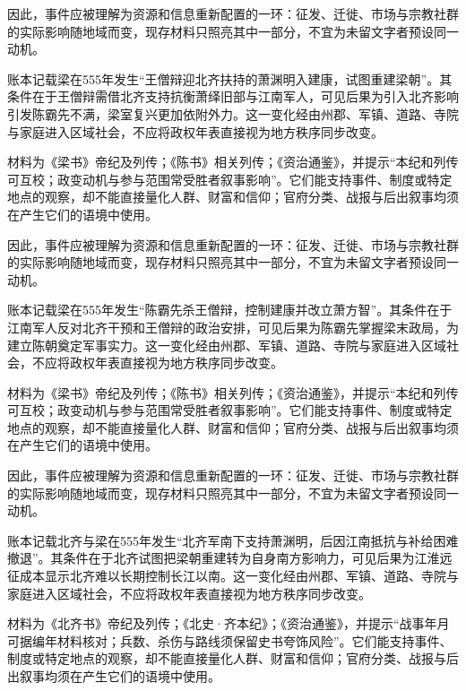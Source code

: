 因此，事件应被理解为资源和信息重新配置的一环：征发、迁徙、市场与宗教社群的实际影响随地域而变，现存材料只照亮其中一部分，不宜为未留文字者预设同一动机。

账本记载梁在555年发生“王僧辩迎北齐扶持的萧渊明入建康，试图重建梁朝”。其条件在于王僧辩需借北齐支持抗衡萧绎旧部与江南军人，可见后果为引入北齐影响引发陈霸先不满，梁室复兴更加依附外力。这一变化经由州郡、军镇、道路、寺院与家庭进入区域社会，不应将政权年表直接视为地方秩序同步改变。

材料为《梁书》帝纪及列传；《陈书》相关列传；《资治通鉴》，并提示“本纪和列传可互校；政变动机与参与范围常受胜者叙事影响”。它们能支持事件、制度或特定地点的观察，却不能直接量化人群、财富和信仰；官府分类、战报与后出叙事均须在产生它们的语境中使用。

因此，事件应被理解为资源和信息重新配置的一环：征发、迁徙、市场与宗教社群的实际影响随地域而变，现存材料只照亮其中一部分，不宜为未留文字者预设同一动机。

账本记载梁在555年发生“陈霸先杀王僧辩，控制建康并改立萧方智”。其条件在于江南军人反对北齐干预和王僧辩的政治安排，可见后果为陈霸先掌握梁末政局，为建立陈朝奠定军事实力。这一变化经由州郡、军镇、道路、寺院与家庭进入区域社会，不应将政权年表直接视为地方秩序同步改变。

材料为《梁书》帝纪及列传；《陈书》相关列传；《资治通鉴》，并提示“本纪和列传可互校；政变动机与参与范围常受胜者叙事影响”。它们能支持事件、制度或特定地点的观察，却不能直接量化人群、财富和信仰；官府分类、战报与后出叙事均须在产生它们的语境中使用。

因此，事件应被理解为资源和信息重新配置的一环：征发、迁徙、市场与宗教社群的实际影响随地域而变，现存材料只照亮其中一部分，不宜为未留文字者预设同一动机。

账本记载北齐与梁在555年发生“北齐军南下支持萧渊明，后因江南抵抗与补给困难撤退”。其条件在于北齐试图把梁朝重建转为自身南方影响力，可见后果为江淮远征成本显示北齐难以长期控制长江以南。这一变化经由州郡、军镇、道路、寺院与家庭进入区域社会，不应将政权年表直接视为地方秩序同步改变。

材料为《北齐书》帝纪及列传；《北史·齐本纪》；《资治通鉴》，并提示“战事年月可据编年材料核对；兵数、杀伤与路线须保留史书夸饰风险”。它们能支持事件、制度或特定地点的观察，却不能直接量化人群、财富和信仰；官府分类、战报与后出叙事均须在产生它们的语境中使用。

